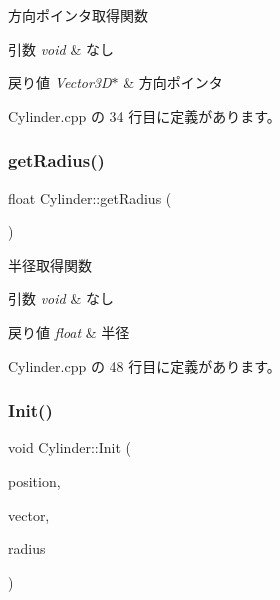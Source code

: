 方向ポインタ取得関数 


\begin{DoxyParams}{引数}
{\em void} & なし \\
\hline
\end{DoxyParams}

\begin{DoxyRetVals}{戻り値}
{\em Vector3\+D$\ast$} & 方向ポインタ \\
\hline
\end{DoxyRetVals}


 Cylinder.\+cpp の 34 行目に定義があります。

\mbox{\label{class_cylinder_a54bd26ac60e885bdca9a101fcc998711}} 
\subsubsection{\texorpdfstring{get\+Radius()}{getRadius()}}
{\footnotesize\ttfamily float Cylinder\+::get\+Radius (\begin{DoxyParamCaption}{ }\end{DoxyParamCaption})}



半径取得関数 


\begin{DoxyParams}{引数}
{\em void} & なし \\
\hline
\end{DoxyParams}

\begin{DoxyRetVals}{戻り値}
{\em float} & 半径 \\
\hline
\end{DoxyRetVals}


 Cylinder.\+cpp の 48 行目に定義があります。

\mbox{\label{class_cylinder_ab7d8167ece18b76e324a06482d22dacb}} 
\subsubsection{\texorpdfstring{Init()}{Init()}}
{\footnotesize\ttfamily void Cylinder\+::\+Init (\begin{DoxyParamCaption}\item[{\mbox{\hyperlink{class_vector3_d}{Vector3D}}}]{position,  }\item[{\mbox{\hyperlink{class_vector3_d}{Vector3D}}}]{vector,  }\item[{float}]{radius }\end{DoxyParamCaption})}



